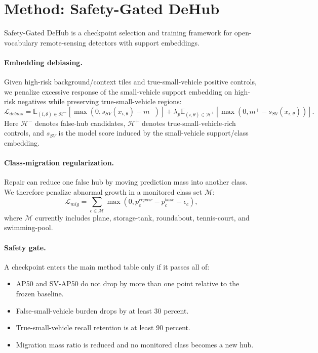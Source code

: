 \documentclass[letterpaper]{article}
\newcommand{\ours}{Safety-Gated DeHub}
\newcommand{\sv}{small-vehicle}
\begin{document}
\section{Method: Safety-Gated DeHub}

\ours{} is a checkpoint selection and training framework for open-vocabulary remote-sensing detectors with support embeddings.

\paragraph{Embedding debiasing.}
Given high-risk background/context tiles and true-\sv{} positive controls, we penalize excessive response of the \sv{} support embedding on high-risk negatives while preserving true-\sv{} regions:
\begin{equation}
\mathcal{L}_{debias} =
\mathbb{E}_{(i,\theta)\in \mathcal{H}^{-}}
[\max(0, s_{SV}(x_{i,\theta}) - m^{-})]
+ \lambda_{p}\mathbb{E}_{(i,\theta)\in \mathcal{H}^{+}}
[\max(0, m^{+} - s_{SV}(x_{i,\theta}))].
\end{equation}
Here $\mathcal{H}^{-}$ denotes false-hub candidates, $\mathcal{H}^{+}$ denotes true-\sv{}-rich controls, and $s_{SV}$ is the model score induced by the \sv{} support/class embedding.

\paragraph{Class-migration regularization.}
Repair can reduce one false hub by moving prediction mass into another class. We therefore penalize abnormal growth in a monitored class set $\mathcal{M}$:
\begin{equation}
\mathcal{L}_{mig} =
\sum_{c\in \mathcal{M}}
\max(0, p_c^{repair} - p_c^{base} - \epsilon_c),
\end{equation}
where $\mathcal{M}$ currently includes plane, storage-tank, roundabout, tennis-court, and swimming-pool.

\paragraph{Safety gate.}
A checkpoint enters the main method table only if it passes all of:
\begin{itemize}
  \item AP50 and SV-AP50 do not drop by more than one point relative to the frozen baseline.
  \item False-\sv{} burden drops by at least 30 percent.
  \item True-\sv{} recall retention is at least 90 percent.
  \item Migration mass ratio is reduced and no monitored class becomes a new hub.
\end{itemize}
\end{document}
